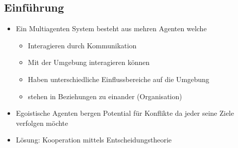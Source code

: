 \documentclass{article} %
\begin{document}
	\subsection{Einführung}
	\begin{itemize}
		\item Ein Multiagenten System besteht aus mehren Agenten welche
		\begin{itemize}
			\item Interagieren durch Kommunikation
			\item Mit der Umgebung interagieren können
			\item Haben unterschiedliche Einflussbereiche auf die Umgebung
			\item stehen in Beziehungen zu einander (Organisation)
		\end{itemize}
		\item Egoistische Agenten bergen Potential für Konflikte da jeder seine Ziele verfolgen möchte
		\item Lösung: Kooperation mittels Entscheidungstheorie
	\end{itemize}
\end{document}

